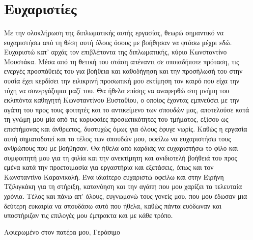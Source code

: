 \section*{Ευχαριστίες}
\paragraph{} Με την ολοκλήρωση της διπλωματικής αυτής εργασίας, θεωρώ σημαντικό να
ευχαριστήσω από τη θέση αυτή όλους όσους με βοήθησαν να φτάσω μέχρι εδώ. Ευχαριστώ κατ'
αρχάς τον επιβλέποντα της διπλωματικής, κύριο Κωνσταντίνο Μουστάκα. Μέσα από τη θετική του
στάση απέναντι σε οποιαδήποτε πρόταση, τις ενεργές προσπάθειές του για βοήθεια και
καθοδήγηση και την προσήλωσή του στην ουσία έχει κερδίσει την ειλικρινή προσωπική μου
εκτίμηση τον καιρό που είχα την τύχη να συνεργάζομαι μαζί του. Θα ήθελα επίσης να αναφερθώ
στη μνήμη του εκλιπόντα καθηγητή Κωνσταντίνου Ευσταθίου, ο οποίος έχοντας εμπνεύσει με την
αγάπη του προς τους φοιτητές και το αντικείμενο των σπουδών μας, αποτελούσε κατά τη γνώμη
μου μία από τις κορυφαίες προσωπικότητες του τμήματος, εξίσου ως επιστήμονας και άνθρωπος,
δυστυχώς όμως για όλους έφυγε νωρίς. Καθώς η εργασία αυτή σηματοδοτεί και το τέλος των
σπουδών μου, οφείλω να ευχαριστήσω τους ανθρώπους που με βοήθησαν. Θα ήθελα από καρδιάς να
ευχαριστήσω το φίλο και συμφοιτητή μου  για τη φιλία και την
ανεκτίμητη και ανιδιοτελή βοήθειά του προς εμένα κατά την προετοιμασία για εργαστήρια και
εξετάσεις, όπως και τον Κωνσταντίνο Καρανικολή. Ένα ιδιαίτερο ευχαριστώ οφείλω και στην
Ειρήνη Τζιλιγκάκη για τη στήριξη, κατανόηση και την αγάπη που μου χαρίζει τα τελευταία
χρόνια. Τέλος και πάνω απ' όλους, ευγνωμονώ τους γονείς μου, που μου έδωσαν μια δεύτερη
ευκαιρία να σπουδάσω αυτό που ήθελα, καθώς πάντα ευόδωναν και υποστήριζαν τις επιλογές μου
έμπρακτα και με κάθε τρόπο.

\clearpage

\begin{center}
  \null\vfill
  \large{Αφιερωμένο στον πατέρα μου, Γεράσιμο}
  \vspace{2cm}
  \null\vfill
\end{center}

\thispagestyle{empty} 

